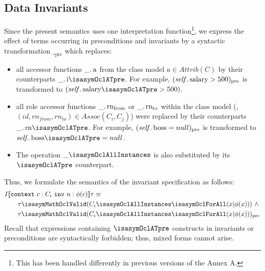 \subsection{Data Invariants}\label{sec:invlogic}
Since the present \OCL semantics uses one interpretation function\footnote{This has been handled
differently in previous versions of the Annex A.}, we express the effect of \OCL terms
occurring in preconditions and invariants by a syntactic transformation $\__\text{pre}$ which
replaces:
\begin{itemize}
\item all accessor functions $\getAttrib{\_}{a}$ from the class model $a \in Attrib(C)$ by their
counterparts $\getAttrib{\_}{i\isasymOclATpre}$. For example, $(\getAttrib{\self}{salary} >
500)_\text{pre}$ is transformed to $(\getAttrib{\self}{salary\isasymOclATpre} > 500)$.
\item all role accessor functions  $\getRole{\_}{rn_{from}}$ or  $\getRole{\_}{rn_{to}}$
      within the class model (\ie, $(id, rn_{from},  rn_{to}) \in Assoc(C_i, C_j)$)
      were replaced by their counterparts $\getRole{\_}{rn\isasymOclATpre}$.
      For example, $(\getAttrib{\self}{boss} = null)_\text{pre}$ is transformed to
      $\getAttrib{\self}{boss\isasymOclATpre} = null$.
\item The operation $\_\isasymOclAllInstances$ is also substituted by its
$\isasymOclATpre$ counterpart.
\end{itemize}
Thus, we formulate the semantics of the invariant specification  as follows:
\begin{gather*}
\begin{aligned}
& I\semantics{\mathtt{context}~c:C_i~\mathtt{inv}~n: \phi(c)} \tau \equiv  \\
&\qquad \tau  \isasymMathOclValid  (C_i\isasymOclAllInstances\isasymOclForAll(x
\text{|} \phi(x)))~\land \\
&\qquad \tau  \isasymMathOclValid (C_i\isasymOclAllInstances\isasymOclForAll(x
\text{|} \phi(x)))_\text{pre}
\end{aligned}
\end{gather*}
Recall that  expressions containing $\isasymOclATpre$ constructs in
invariants or preconditions are syntactically forbidden; thus, mixed forms cannot arise.

